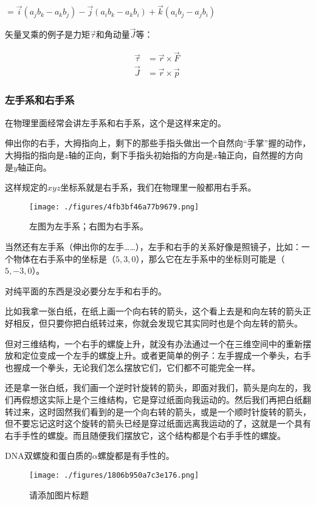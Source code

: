 $= \vec i (a_j b_k - a_k b_j) - \vec j (a_i b_k - a_k b_i) + \vec k (a_i b_j - a_j b_i)$

矢量叉乘的例子是力矩$\vec \tau$和角动量$\vec J$等：

\begin{align}
\vec \tau &= \vec r \times \vec F \\
\vec J & =  \vec r \times \vec p~
\end{align}

\subsubsection{左手系和右手系}

在物理里面经常会讲左手系和右手系，这个是这样来定的。

伸出你的右手，大拇指向上，剩下的那些手指头做出一个自然向“手掌”握的动作，大拇指的指向是$z$轴的正向，剩下手指头初始指的方向是$x$轴正向，自然握的方向是$y$轴正向。

这样规定的$xyz$坐标系就是右手系，我们在物理里一般都用右手系。

\begin{figure}[ht]
\centering
\texttt{[image: ./figures/4fb3bf46a77b9679.png]}
\caption{左图为左⼿系；右图为右⼿系。} \label{fig_QMPre6_6}
\end{figure}

当然还有左手系（伸出你的左手……），左手和右手的关系好像是照镜子，比如：一个物体在右手系中的坐标是（$5, 3, 0$），那么它在左手系中的坐标则可能是（$5, -3, 0$）。

对纯平面的东西是没必要分左手和右手的。

比如我拿一张白纸，在纸上画一个向右转的箭头，这个看上去是和向左转的箭头正好相反，但只要你把白纸转过来，你就会发现它其实同时也是个向左转的箭头。

但对三维结构，一个右手的螺旋上升，就没有办法通过一个在三维空间中的重新摆放和定位变成一个左手的螺旋上升。或者更简单的例子：左手握成一个拳头，右手也握成一个拳头，无论我们怎么摆放它们，它们都不可能完全一样。

还是拿一张白纸，我们画一个逆时针旋转的箭头，即面对我们，箭头是向左的，我们再假想这实际上是个三维结构，它是穿过纸面向我运动的。然后我们再把白纸翻转过来，这时固然我们看到的是一个向右转的箭头，或是一个顺时针旋转的箭头，但不要忘记这时这个旋转的箭头已经是穿过纸面远离我运动的了，这就是一个具有右手手性的螺旋。而且随便我们摆放它，这个结构都是个右手手性的螺旋。

DNA双螺旋和蛋白质的$\alpha$螺旋都是有手性的。

\begin{figure}[ht]
\centering
\texttt{[image: ./figures/1806b950a7c3e176.png]}
\caption{请添加图片标题} \label{fig_QMPre6_7}
\end{figure}
